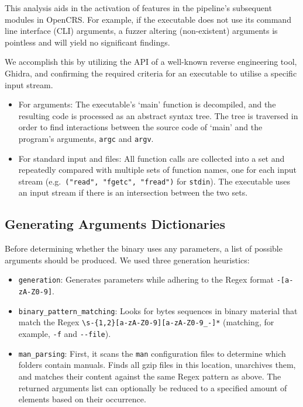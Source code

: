 \documentclass[../main.tex]{subfiles}
\begin{document}
This analysis aids in the activation of features in the pipeline's
subsequent modules in OpenCRS. For example, if the executable does not
use its command line interface (CLI) arguments, a fuzzer altering (non-existent) arguments
is pointless and will yield no significant findings.

We accomplish this by utilizing the API of a well-known reverse
engineering tool, Ghidra, and confirming the required criteria for
an executable to utilise a specific input stream.

\begin{itemize}
\tightlist
\item
  For arguments: The executable's `main' function is decompiled, and the
  resulting code is processed as an abstract syntax tree. The tree is traversed in order
  to find interactions between the source code of `main' and the
  program's arguments, \texttt{argc} and \texttt{argv}.
\item
  For standard input and files: All function calls are collected into a
  set and repeatedly compared with multiple sets of function names, one
  for each input stream (e.g.~\texttt{("read",\ "fgetc",\ "fread")} for
  \texttt{stdin}). The executable uses an input stream if there is an
  intersection between the two sets.
\end{itemize}

\hypertarget{generating-arguments-dictionaries}{%
\subsection{Generating Arguments
Dictionaries}\label{generating-arguments-dictionaries}}

Before determining whether the binary uses any parameters, a list of
possible arguments should be produced. We used three generation
heuristics:

\begin{itemize}
\tightlist
\item
  \texttt{generation}: Generates parameters while adhering to the
  Regex format \texttt{-{[}a-zA-Z0-9{]}}.
\item
  \texttt{binary\_pattern\_matching}: Looks for bytes sequences in
  binary material that match the Regex
  \texttt{\textbackslash{}s-\{1,2\}{[}a-zA-Z0-9{]}{[}a-zA-Z0-9\_-{]}*}
  (matching, for example, \texttt{-f} and \texttt{-\/-file}).
\item
  \texttt{man\_parsing}: First, it scans the \texttt{man} configuration
  files to determine which folders contain manuals. Finds all gzip files
  in this location, unarchives them, and matches their content against
  the same Regex pattern as above. The returned arguments list can
  optionally be reduced to a specified amount of elements based on their
  occurrence.
\end{itemize}
\end{document}
